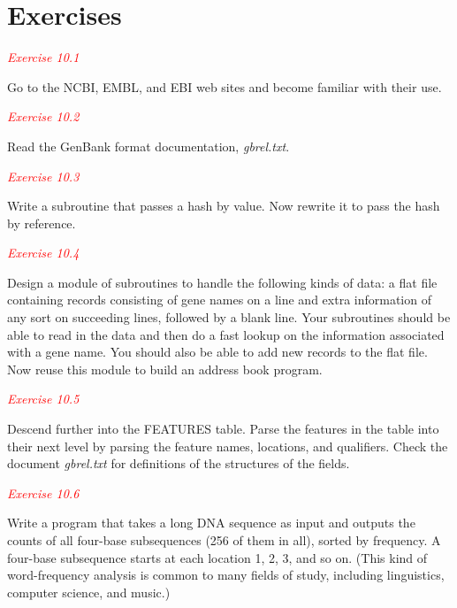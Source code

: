 \section{Exercises}
\textcolor{red}{\textit{Exercise 10.1}}
\begin{adjustwidth}{1cm}{}
Go to the NCBI, EMBL, and EBI web sites and become familiar with their use.
\end{adjustwidth}

\textcolor{red}{\textit{Exercise 10.2}}
\begin{adjustwidth}{1cm}{}
Read the GenBank format documentation, \textit{gbrel.txt}.
\end{adjustwidth}

\textcolor{red}{\textit{Exercise 10.3}}
\begin{adjustwidth}{1cm}{}
Write a subroutine that passes a hash by value. Now rewrite it to pass the hash by reference.
\end{adjustwidth}

\textcolor{red}{\textit{Exercise 10.4}}
\begin{adjustwidth}{1cm}{}
Design a module of subroutines to handle the following kinds of data: a flat file containing records consisting of gene names on a line and extra information of any sort on succeeding lines, followed by a blank line. Your subroutines should be able to read in the data and then do a fast lookup on the information associated with a gene name. You should also be able to add new records to the flat file. Now reuse this module to build an address book program.
\end{adjustwidth}

\textcolor{red}{\textit{Exercise 10.5}}
\begin{adjustwidth}{1cm}{}
Descend further into the FEATURES table. Parse the features in the table into their next level by parsing the feature names, locations, and qualifiers. Check the document \textit{gbrel.txt} for definitions of the structures of the fields.
\end{adjustwidth}

\textcolor{red}{\textit{Exercise 10.6}}
\begin{adjustwidth}{1cm}{}
Write a program that takes a long DNA sequence as input and outputs the counts of all four-base subsequences (256 of them in all), sorted by frequency. A four-base subsequence starts at each location 1, 2, 3, and so on. (This kind of word-frequency analysis is common to many fields of study, including linguistics, computer science, and music.)
\end{adjustwidth}

